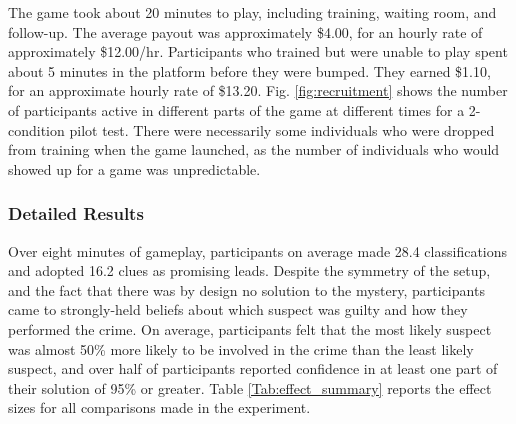\documentclass{article}
\begin{document}
The game took about 20 minutes to play, including training, waiting room, and follow-up. The average payout was approximately \$4.00, for an hourly rate of approximately \$12.00/hr. Participants who trained but were unable to play spent about 5 minutes in the platform before they were bumped. They earned \$1.10, for an approximate hourly rate of \$13.20.  Fig. \ref{fig:recruitment} shows the number of participants active in different parts of the game at different times for a 2-condition pilot test. There were necessarily some individuals who were dropped from training when the game launched, as the number of individuals who would showed up for a game was unpredictable.



\subsubsection{Detailed Results}
Over eight minutes of gameplay, participants on average made 28.4 classifications and adopted 16.2 clues as promising leads. 
Despite the symmetry of the setup, and the fact that there was by design no solution to the mystery, participants came to strongly-held beliefs about which suspect was guilty and how they performed the crime. On average, participants felt that the most likely suspect was almost 50\% more likely to be involved in the crime than the least likely suspect, and over half of participants reported confidence in at least one part of their solution of 95\% or greater. Table \ref{Tab:effect_summary} reports the effect sizes for all comparisons made in the experiment.
\end{document}
